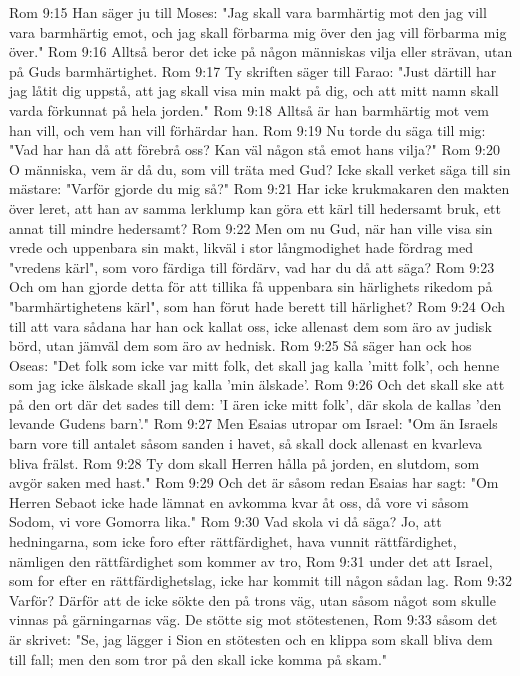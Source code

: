 Rom 9:15  Han säger ju till Moses: "Jag skall vara barmhärtig mot den jag vill vara barmhärtig emot, och jag skall förbarma mig över den jag vill förbarma mig över."
Rom 9:16  Alltså beror det icke på någon människas vilja eller strävan, utan på Guds barmhärtighet.
Rom 9:17  Ty skriften säger till Farao: "Just därtill har jag låtit dig uppstå, att jag skall visa min makt på dig, och att mitt namn skall varda förkunnat på hela jorden."
Rom 9:18  Alltså är han barmhärtig mot vem han vill, och vem han vill förhärdar han.
Rom 9:19  Nu torde du säga till mig: "Vad har han då att förebrå oss? Kan väl någon stå emot hans vilja?"
Rom 9:20  O människa, vem är då du, som vill träta med Gud? Icke skall verket säga till sin mästare: "Varför gjorde du mig så?"
Rom 9:21  Har icke krukmakaren den makten över leret, att han av samma lerklump kan göra ett kärl till hedersamt bruk, ett annat till mindre hedersamt?
Rom 9:22  Men om nu Gud, när han ville visa sin vrede och uppenbara sin makt, likväl i stor långmodighet hade fördrag med "vredens kärl", som voro färdiga till fördärv, vad har du då att säga?
Rom 9:23  Och om han gjorde detta för att tillika få uppenbara sin härlighets rikedom på "barmhärtighetens kärl", som han förut hade berett till härlighet?
Rom 9:24  Och till att vara sådana har han ock kallat oss, icke allenast dem som äro av judisk börd, utan jämväl dem som äro av hednisk.
Rom 9:25  Så säger han ock hos Oseas: "Det folk som icke var mitt folk, det skall jag kalla 'mitt folk', och henne som jag icke älskade skall jag kalla 'min älskade'.
Rom 9:26  Och det skall ske att på den ort där det sades till dem: 'I ären icke mitt folk', där skola de kallas 'den levande Gudens barn'."
Rom 9:27  Men Esaias utropar om Israel: "Om än Israels barn vore till antalet såsom sanden i havet, så skall dock allenast en kvarleva bliva frälst.
Rom 9:28  Ty dom skall Herren hålla på jorden, en slutdom, som avgör saken med hast."
Rom 9:29  Och det är såsom redan Esaias har sagt: "Om Herren Sebaot icke hade lämnat en avkomma kvar åt oss, då vore vi såsom Sodom, vi vore Gomorra lika."
Rom 9:30  Vad skola vi då säga? Jo, att hedningarna, som icke foro efter rättfärdighet, hava vunnit rättfärdighet, nämligen den rättfärdighet som kommer av tro,
Rom 9:31  under det att Israel, som for efter en rättfärdighetslag, icke har kommit till någon sådan lag.
Rom 9:32  Varför? Därför att de icke sökte den på trons väg, utan såsom något som skulle vinnas på gärningarnas väg. De stötte sig mot stötestenen,
Rom 9:33  såsom det är skrivet: "Se, jag lägger i Sion en stötesten och en klippa som skall bliva dem till fall; men den som tror på den skall icke komma på skam."
